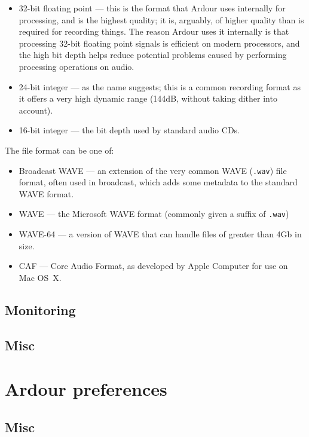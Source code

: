 \documentclass[10pt,a4paper]{book}
\begin{document}
{\begin{itemize}
\item 32-bit floating point --- this is the format that Ardour uses
  internally for processing, and is the highest quality; it is,
  arguably, of higher quality than is required for recording things.
  The reason Ardour uses it internally is that processing 32-bit
  floating point signals is efficient on modern processors, and the
  high bit depth helps reduce potential problems caused by performing
  processing operations on audio.
\item 24-bit integer --- as the name suggests; this is a common
  recording format as it offers a very high dynamic range (144dB,
  without taking dither into account).
\item 16-bit integer --- the bit depth used by standard audio CDs.
\end{itemize}

The file format can be one of:

\begin{itemize}
\item Broadcast WAVE --- an extension of the very common WAVE
  (\texttt{.wav}) file format, often used in broadcast, which adds
  some metadata to the standard WAVE format.
\item WAVE --- the Microsoft WAVE format (commonly given a suffix of \texttt{.wav})
\item WAVE-64 --- a version of WAVE that can handle files of greater than 4Gb in size.
\item CAF --- Core Audio Format, as developed by Apple Computer for use on Mac OS~X.
\end{itemize}

\subsection{Monitoring}

\subsection{Misc}



\section{Ardour preferences}

\subsection{Misc}

}
\end{document}

